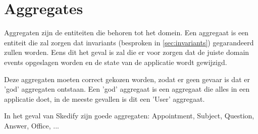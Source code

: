 
\section{Aggregates}
\label{sec:aggregates}

Aggregaten zijn de entiteiten die behoren tot het domein. Een aggregaat is een entiteit die zal zorgen dat invariants (besproken in \ref{sec:invariants}) gegarandeerd zullen worden. Eens dit het geval is zal die er voor zorgen dat de juiste domain events opgeslagen worden en de state van de applicatie wordt gewijzigd.

Deze aggregaten moeten correct gekozen worden, zodat er geen gevaar is dat er 'god' aggregaten ontstaan. Een 'god' aggregaat is een aggregaat die alles in een applicatie doet, in de meeste gevallen is dit een 'User' aggregaat.

In het geval van Skedify zijn goede aggregaten: Appointment, Subject, Question, Answer, Office, ...